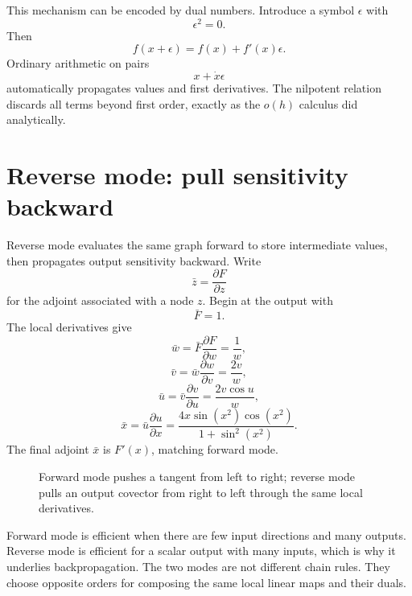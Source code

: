 This mechanism can be encoded by dual numbers.  Introduce a symbol \(\epsilon\) with
\[
  \epsilon^2=0.
\]
Then
\[
  f(x+\epsilon)=f(x)+f'(x)\epsilon.
\]
Ordinary arithmetic on pairs
\[
  x+\dot x\epsilon
\]
automatically propagates values and first derivatives.  The nilpotent relation discards all terms beyond first order, exactly as the \(o(h)\) calculus did analytically.

\section{Reverse mode: pull sensitivity backward}

Reverse mode evaluates the same graph forward to store intermediate values, then propagates output sensitivity backward.  Write
\[
  \bar z=\frac{\partial F}{\partial z}
\]
for the adjoint associated with a node \(z\).  Begin at the output with
\[
  \bar F=1.
\]
The local derivatives give
\[
  \bar w=\bar F\frac{\partial F}{\partial w}
  =\frac1w,
\]
\[
  \bar v=\bar w\frac{\partial w}{\partial v}
  =\frac{2v}{w},
\]
\[
  \bar u=\bar v\frac{\partial v}{\partial u}
  =\frac{2v\cos u}{w},
\]
\[
  \bar x=\bar u\frac{\partial u}{\partial x}
  =\frac{4x\sin(x^2)\cos(x^2)}
  {1+\sin^2(x^2)}.
\]
The final adjoint \(\bar x\) is \(F'(x)\), matching forward mode.

\begin{figure}[H]
\centering
{}
\caption{Forward mode pushes a tangent from left to right; reverse mode pulls an output covector from right to left through the same local derivatives.}
\end{figure}

Forward mode is efficient when there are few input directions and many outputs.  Reverse mode is efficient for a scalar output with many inputs, which is why it underlies backpropagation.  The two modes are not different chain rules.  They choose opposite orders for composing the same local linear maps and their duals.

